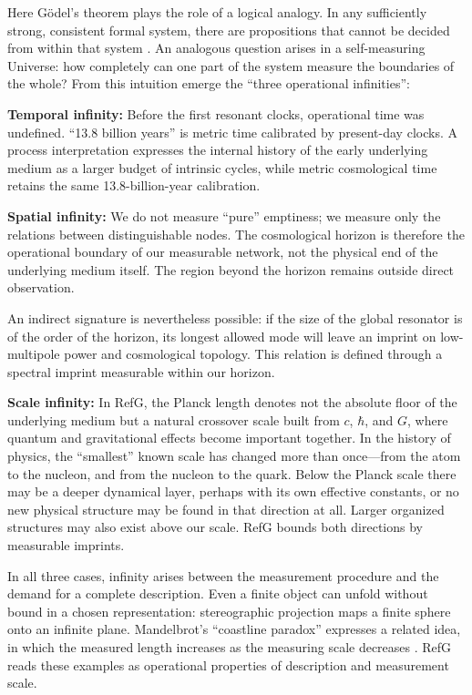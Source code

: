 \documentclass[11pt,a4paper]{article}
\begin{document}
Here Gödel's theorem plays the role of a logical analogy. In any sufficiently strong, consistent formal system, there are propositions that cannot be decided from within that system \citep{godel1931}. An analogous question arises in a self-measuring Universe: how completely can one part of the system measure the boundaries of the whole? From this intuition emerge the “three operational infinities”:

\textbf{Temporal infinity:} Before the first resonant clocks, operational time was undefined. “13.8 billion years” is metric time calibrated by present-day clocks. A process interpretation expresses the internal history of the early underlying medium as a larger budget of intrinsic cycles, while metric cosmological time retains the same 13.8-billion-year calibration.

\textbf{Spatial infinity:} We do not measure “pure” emptiness; we measure only the relations between distinguishable nodes. The cosmological horizon is therefore the operational boundary of our measurable network, not the physical end of the underlying medium itself. The region beyond the horizon remains outside direct observation.

An indirect signature is nevertheless possible: if the size of the global resonator is of the order of the horizon, its longest allowed mode will leave an imprint on low-multipole power and cosmological topology. This relation is defined through a spectral imprint measurable within our horizon.

\textbf{Scale infinity:} In RefG, the Planck length denotes not the absolute floor of the underlying medium but a natural crossover scale built from $c$, $\hbar$, and $G$, where quantum and gravitational effects become important together. In the history of physics, the “smallest” known scale has changed more than once---from the atom to the nucleon, and from the nucleon to the quark. Below the Planck scale there may be a deeper dynamical layer, perhaps with its own effective constants, or no new physical structure may be found in that direction at all. Larger organized structures may also exist above our scale. RefG bounds both directions by measurable imprints.

In all three cases, infinity arises between the measurement procedure and the demand for a complete description. Even a finite object can unfold without bound in a chosen representation: stereographic projection maps a finite sphere onto an infinite plane. Mandelbrot's “coastline paradox” expresses a related idea, in which the measured length increases as the measuring scale decreases \citep{mandelbrot1982}. RefG reads these examples as operational properties of description and measurement scale.
\end{document}
